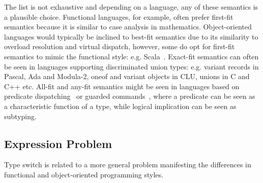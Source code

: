 \noindent
The list is not exhaustive and depending on a language, any of these semantics 
is a plausible choice. Functional languages, for example, often prefer 
first-fit semantics because it is similar to case analysis in mathematics. 
Object-oriented languages would typically be inclined to best-fit semantics due 
to its similarity to overload resolution and virtual dispatch, however, some 
do opt for first-fit semantics to mimic the functional style: e.g. Scala~\cite{Scala2nd}. 
Exact-fit semantics can often be seen in languages supporting discriminated 
union types: e.g. variant records in Pascal, Ada and Modula-2, oneof and variant 
objects in CLU, unions in C and C++ etc.
All-fit and any-fit semantics might be seen in languages based on predicate 
dispatching~\cite{ErnstKC98} or guarded commands~\cite{EWD:EWD472}, where a 
predicate can be seen as a characteristic function of a type, while logical 
implication can be seen as subtyping.

\subsection{Expression Problem}

Type switch is related to a more general problem manifesting the differences 
in functional and object-oriented programming styles.

%

